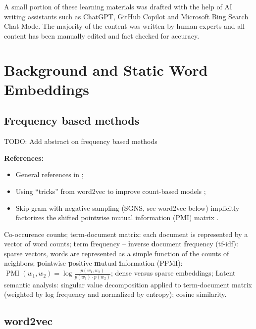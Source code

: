 \documentclass[11pt, a4paper]{amsart}
\begin{document}
A small portion of these learning materials was drafted with the help of AI writing assistants such as ChatGPT, GitHub Copilot and Microsoft Bing Search Chat Mode. The majority of the content was written by human experts and all content has been manually edited and fact checked for accuracy. \\

\section{Background and Static Word Embeddings}
\label{sec:static_word_embeddings}


\subsection{Frequency based methods}

TODO: Add abstract on frequency based methods

\noindent \textbf{References:}
\begin{itemize}
    \item General references in ;
    \item Using ``tricks'' from word2vec to improve count-based models \cite{levy-etal-2015-improving};
    \item Skip-gram with negative-sampling (SGNS, see word2vec below) implicitly factorizes the shifted pointwise mutual information (PMI) matrix \cite{NIPS2014_feab05aa}.
\end{itemize}

{
	\color{blue}
	
	Co-occurence counts;
	term-document matrix: each document is represented by a vector of word counts;
	\textbf{t}erm \textbf{f}requency -- \textbf{i}nverse \textbf{d}ocument \textbf{f}requency (tf-idf):
	sparse vectors, words are represented as a simple function of the counts of neighbors;
	\textbf{p}ointwise \textbf{p}ositive \textbf{m}utual \textbf{i}nformation (PPMI):
	$\operatorname{PMI}(w_{1}, w_{2}) = \log \frac{p(w_{1}, w_{2})}{p(w_{1}) \cdot p(w_{2})}$;
	dense versus sparse embeddings;
	Latent semantic analysis:
	singular value decomposition applied to term-document matrix (weighted by log frequency and normalized by entropy);
	cosine similarity.
} %

\subsection{word2vec}
\end{document}
